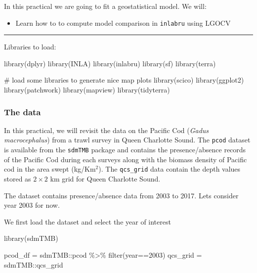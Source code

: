 \documentclass[
  letterpaper,
  DIV=11,
  numbers=noendperiod]{scrartcl}
\newenvironment{Shaded}{\begin{snugshade}}{\end{snugshade}}
\newcommand{\CommentTok}[1]{\textcolor[rgb]{0.37,0.37,0.37}{#1}}
\newcommand{\DecValTok}[1]{\textcolor[rgb]{0.68,0.00,0.00}{#1}}
\newcommand{\FunctionTok}[1]{\textcolor[rgb]{0.28,0.35,0.67}{#1}}
\newcommand{\NormalTok}[1]{\textcolor[rgb]{0.00,0.23,0.31}{#1}}
\newcommand{\OtherTok}[1]{\textcolor[rgb]{0.00,0.23,0.31}{#1}}
\newcommand{\SpecialCharTok}[1]{\textcolor[rgb]{0.37,0.37,0.37}{#1}}
\providecommand{\tightlist}{%
  \setlength{\itemsep}{0pt}\setlength{\parskip}{0pt}}\usepackage{longtable,booktabs,array}
\begin{document}
In this practical we are going to fit a geostatistical model. We will:

\begin{itemize}
\tightlist
\item
  Learn how to to compute model comparison in \texttt{inlabru} using
  LGOCV
\end{itemize}

\begin{center}\rule{0.5\linewidth}{0.5pt}\end{center}

Libraries to load:

\begin{Shaded}
\begin{Highlighting}[]
\FunctionTok{library}\NormalTok{(dplyr)}
\FunctionTok{library}\NormalTok{(INLA)}
\FunctionTok{library}\NormalTok{(inlabru) }
\FunctionTok{library}\NormalTok{(sf)}
\FunctionTok{library}\NormalTok{(terra)}


\CommentTok{\# load some libraries to generate nice map plots}
\FunctionTok{library}\NormalTok{(scico)}
\FunctionTok{library}\NormalTok{(ggplot2)}
\FunctionTok{library}\NormalTok{(patchwork)}
\FunctionTok{library}\NormalTok{(mapview)}
\FunctionTok{library}\NormalTok{(tidyterra)}
\end{Highlighting}
\end{Shaded}

\subsubsection{The data}\label{the-data}

In this practical, we will revisit the data on the Pacific Cod
(\emph{Gadus macrocephalus}) from a trawl survey in Queen Charlotte
Sound. The \texttt{pcod} dataset is available from the \texttt{sdmTMB}
package and contains the presence/absence records of the Pacific Cod
during each surveys along with the biomass density of Pacific cod in the
area swept (kg/Km\(^2\)). The \texttt{qcs\_grid} data contain the depth
values stored as \(2\times 2\) km grid for Queen Charlotte Sound.

The dataset contains presence/absence data from 2003 to 2017. Lets
consider year 2003 for now.

We first load the dataset and select the year of interest

\begin{Shaded}
\begin{Highlighting}[]
\FunctionTok{library}\NormalTok{(sdmTMB)}

\NormalTok{pcod\_df }\OtherTok{=}\NormalTok{ sdmTMB}\SpecialCharTok{::}\NormalTok{pcod }\SpecialCharTok{\%\textgreater{}\%} \FunctionTok{filter}\NormalTok{(year}\SpecialCharTok{==}\DecValTok{2003}\NormalTok{)}
\NormalTok{qcs\_grid }\OtherTok{=}\NormalTok{ sdmTMB}\SpecialCharTok{::}\NormalTok{qcs\_grid}
\end{Highlighting}
\end{Shaded}
\end{document}
